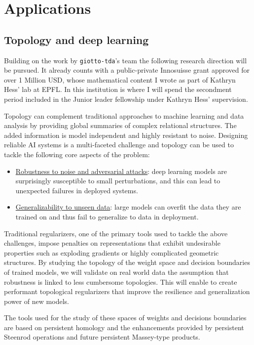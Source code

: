 
\section{Applications} \label{s:applications}

\subsection{Topology and deep learning}

Building on the work by \texttt{giotto-tda}'s team the following research direction will be pursued.
It already counts with a public-private Innosuisse grant approved for over 1 Million USD, whose mathematical content I wrote as part of Kathryn Hess' lab at EPFL.
In this institution is where I will spend the secondment period included in the Junior leader fellowship under Kathryn Hess' supervision.

Topology can complement traditional approaches to machine learning and data analysis by providing global summaries of complex relational structures.
The added information is model independent and highly resistant to noise.
Designing reliable AI systems is a multi-faceted challenge and topology can be used to tackle the following core aspects of the problem:
\begin{itemize}
	\item \underline{Robustness to noise and adversarial attacks}: deep learning models are surprisingly susceptible to small perturbations, and this can lead to unexpected failures in deployed systems.
	\item \underline{Generalizability to unseen data}: large models can overfit the data they are trained on and thus fail to generalize to data in deployment.
\end{itemize}
Traditional regularizers, one of the primary tools used to tackle the above challenges, impose penalties on representations that exhibit undesirable properties such as exploding gradients or highly complicated geometric structures.
By studying the topology of the weight space and decision boundaries of trained models, we will validate on real world data the assumption that robustness is linked to less cumbersome topologies.
This will enable to create performant topological regularizers that improve the resilience and generalization power of new models.

The tools used for the study of these spaces of weights and decisions boundaries are based on persistent homology and the enhancements provided by persistent Steenrod operations and future persistent Massey-type products.


